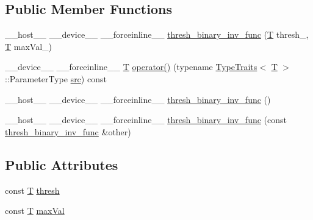 \subsection*{Public Member Functions}
\begin{DoxyCompactItemize}
\item 
\-\_\-\-\_\-host\-\_\-\-\_\- \-\_\-\-\_\-device\-\_\-\-\_\- \-\_\-\-\_\-forceinline\-\_\-\-\_\- \hyperlink{structcv_1_1gpu_1_1device_1_1thresh__binary__inv__func_a988c55f5e550e131d1d6a98dc427e18b}{thresh\-\_\-binary\-\_\-inv\-\_\-func} (\hyperlink{calib3d_8hpp_a3efb9551a871ddd0463079a808916717}{T} thresh\-\_\-, \hyperlink{calib3d_8hpp_a3efb9551a871ddd0463079a808916717}{T} max\-Val\-\_\-)
\item 
\-\_\-\-\_\-device\-\_\-\-\_\- \-\_\-\-\_\-forceinline\-\_\-\-\_\- \hyperlink{calib3d_8hpp_a3efb9551a871ddd0463079a808916717}{T} \hyperlink{structcv_1_1gpu_1_1device_1_1thresh__binary__inv__func_a275366a937256aefce2f7651522ea849}{operator()} (typename \hyperlink{structcv_1_1gpu_1_1device_1_1TypeTraits}{Type\-Traits}$<$ \hyperlink{calib3d_8hpp_a3efb9551a871ddd0463079a808916717}{T} $>$\-::Parameter\-Type \hyperlink{legacy_8hpp_a371cd109b74033bc4366f584edd3dacc}{src}) const 
\item 
\-\_\-\-\_\-host\-\_\-\-\_\- \-\_\-\-\_\-device\-\_\-\-\_\- \-\_\-\-\_\-forceinline\-\_\-\-\_\- \hyperlink{structcv_1_1gpu_1_1device_1_1thresh__binary__inv__func_aea6ef7cad33b0facc396799c32dac373}{thresh\-\_\-binary\-\_\-inv\-\_\-func} ()
\item 
\-\_\-\-\_\-host\-\_\-\-\_\- \-\_\-\-\_\-device\-\_\-\-\_\- \-\_\-\-\_\-forceinline\-\_\-\-\_\- \hyperlink{structcv_1_1gpu_1_1device_1_1thresh__binary__inv__func_a4a84d90735f1d126aff1633da2f794a0}{thresh\-\_\-binary\-\_\-inv\-\_\-func} (const \hyperlink{structcv_1_1gpu_1_1device_1_1thresh__binary__inv__func}{thresh\-\_\-binary\-\_\-inv\-\_\-func} \&other)
\end{DoxyCompactItemize}
\subsection*{Public Attributes}
\begin{DoxyCompactItemize}
\item 
const \hyperlink{calib3d_8hpp_a3efb9551a871ddd0463079a808916717}{T} \hyperlink{structcv_1_1gpu_1_1device_1_1thresh__binary__inv__func_ac4153ad8d75322366054f358046278cd}{thresh}
\item 
const \hyperlink{calib3d_8hpp_a3efb9551a871ddd0463079a808916717}{T} \hyperlink{structcv_1_1gpu_1_1device_1_1thresh__binary__inv__func_a415a9017afbd1924896771cc528661d5}{max\-Val}
\end{DoxyCompactItemize}


